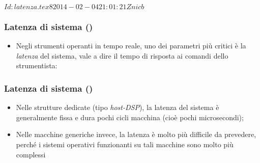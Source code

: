 %
%
%
%
%
\svnInfo $Id: latenza.tex 8 2014-02-04 21:01:21Z nicb $

\setcounter{ms}{0}
\begin{frame}
	\frametitle{Latenza di sistema ()}

	\begin{itemize}[<+- | alert@+->]

		\item Negli strumenti operanti in tempo reale,
              uno dei parametri pi\`u critici \`e la \emph{latenza}
              del sistema, vale a dire il tempo di risposta
              ai comandi dello strumentista:

	\end{itemize}

  \begin{figure}[H]
      \begin{center}
      \end{center}
      \label{fig:latency timing}
  \end{figure}

\end{frame}

\begin{frame}
	\frametitle{Latenza di sistema ()}

	\begin{itemize}[<+- | alert@+->]

		\item Nelle strutture dedicate (tipo \emph{host-DSP}),
              la latenza del sistema \`e generalmente
              fissa e dura pochi cicli macchina
              (cio\`e pochi microsecondi);

		\item Nelle macchine generiche invece,
              la latenza \`e molto pi\`u difficile da prevedere,
              perch\'e i sistemi operativi funzionanti
              su tali macchine sono molto pi\`u complessi

	\end{itemize}

\end{frame}
